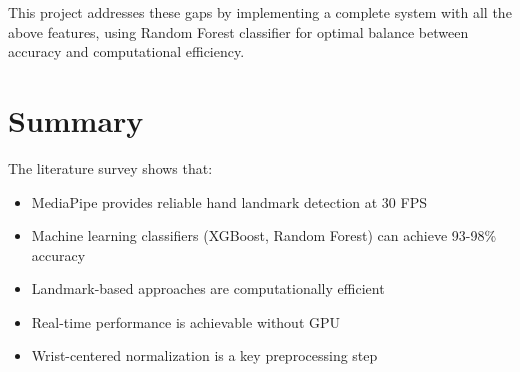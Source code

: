 This project addresses these gaps by implementing a complete system with all the above features, using Random Forest classifier for optimal balance between accuracy and computational efficiency.

\vspace{1em}
\section{Summary}

The literature survey shows that:
\begin{itemize}
    \item MediaPipe provides reliable hand landmark detection at 30 FPS
    \item Machine learning classifiers (XGBoost, Random Forest) can achieve 93-98\% accuracy
    \item Landmark-based approaches are computationally efficient
    \item Real-time performance is achievable without GPU
    \item Wrist-centered normalization is a key preprocessing step
\end{itemize}